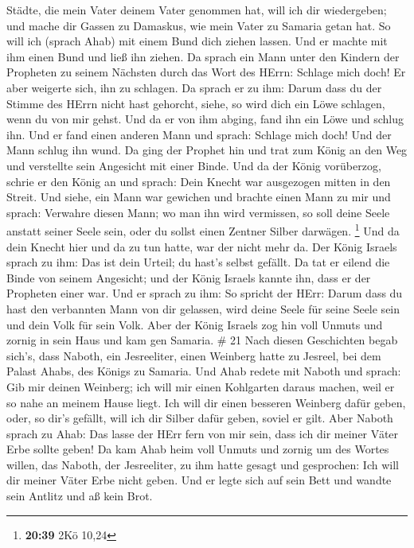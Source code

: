Städte, die mein Vater deinem Vater genommen hat, will ich dir
wiedergeben; und mache dir Gassen zu Damaskus, wie mein Vater zu Samaria
getan hat. So will ich (sprach Ahab) mit einem Bund dich ziehen lassen.
Und er machte mit ihm einen Bund und ließ ihn ziehen.  Da
sprach ein Mann unter den Kindern der Propheten zu seinem Nächsten durch
das Wort des HErrn: Schlage mich doch! Er aber weigerte sich, ihn zu
schlagen.  Da sprach er zu ihm: Darum dass du der Stimme
des HErrn nicht hast gehorcht, siehe, so wird dich ein Löwe schlagen,
wenn du von mir gehst. Und da er von ihm abging, fand ihn ein Löwe und
schlug ihn.  Und er fand einen anderen Mann und sprach:
Schlage mich doch! Und der Mann schlug ihn wund.  Da ging
der Prophet hin und trat zum König an den Weg und verstellte sein
Angesicht mit einer Binde.  Und da der König vorüberzog,
schrie er den König an und sprach: Dein Knecht war ausgezogen mitten in
den Streit. Und siehe, ein Mann war gewichen und brachte einen Mann zu
mir und sprach: Verwahre diesen Mann; wo man ihn wird vermissen, so soll
deine Seele anstatt seiner Seele sein, oder du sollst einen Zentner
Silber darwägen. \footnote{\textbf{20:39} 2Kö 10,24}  Und
da dein Knecht hier und da zu tun hatte, war der nicht mehr da. Der
König Israels sprach zu ihm: Das ist dein Urteil; du hast's selbst
gefällt.  Da tat er eilend die Binde von seinem Angesicht;
und der König Israels kannte ihn, dass er der Propheten einer war.
 Und er sprach zu ihm: So spricht der HErr: Darum dass du
hast den verbannten Mann von dir gelassen, wird deine Seele für seine
Seele sein und dein Volk für sein Volk.  Aber der König
Israels zog hin voll Unmuts und zornig in sein Haus und kam gen Samaria.
\# 21  Nach diesen Geschichten begab sich's, dass Naboth,
ein Jesreeliter, einen Weinberg hatte zu Jesreel, bei dem Palast Ahabs,
des Königs zu Samaria.  Und Ahab redete mit Naboth und
sprach: Gib mir deinen Weinberg; ich will mir einen Kohlgarten daraus
machen, weil er so nahe an meinem Hause liegt. Ich will dir einen
besseren Weinberg dafür geben, oder, so dir's gefällt, will ich dir
Silber dafür geben, soviel er gilt.  Aber Naboth sprach zu
Ahab: Das lasse der HErr fern von mir sein, dass ich dir meiner Väter
Erbe sollte geben!  Da kam Ahab heim voll Unmuts und zornig
um des Wortes willen, das Naboth, der Jesreeliter, zu ihm hatte gesagt
und gesprochen: Ich will dir meiner Väter Erbe nicht geben. Und er legte
sich auf sein Bett und wandte sein Antlitz und aß kein Brot.

